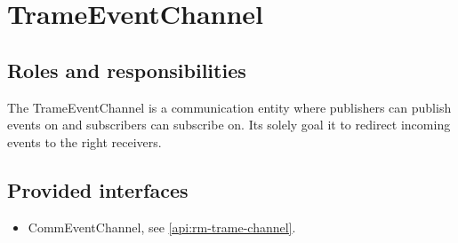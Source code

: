 \section{TrameEventChannel}
\label{element:rm-trame-event-channel}

\subsection{Roles and responsibilities}

\npar The TrameEventChannel is a communication entity where publishers can publish
events on and subscribers can subscribe on. Its solely goal it to redirect
incoming events to the right receivers.

\subsection{Provided interfaces}

\begin{itemize}
  \item CommEventChannel, see \ref{api:rm-trame-channel}.
\end{itemize}